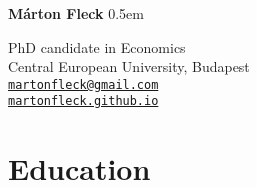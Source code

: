\documentclass[a4paper,11pt]{article}
\begin{document}
{\huge\bf Márton Fleck}
\parskip 0.5em

PhD candidate in Economics \\
Central European University, Budapest \\
\href{mailto:martonfleck@gmail.com}{\tt martonfleck@gmail.com} \\
\href{https://martonfleck.github.io}{\tt martonfleck.github.io}
\section*{Education}
\end{document}
